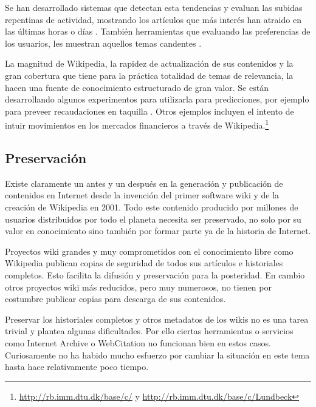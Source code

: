 \documentclass[11pt,onecolumn]{article}
\begin{document}
Se han desarrollado sistemas que detectan esta tendencias y evaluan las subidas repentinas de actividad, mostrando los artículos que más interés han atraido en las últimas horas o días \citep{osborne2012}. También herramientas que evaluando las preferencias de los usuarios, les muestran aquellos temas candentes \citep{ciglan2010}.


La magnitud de Wikipedia, la rapidez de actualización de sus contenidos y la gran cobertura que tiene para la práctica totalidad de temas de relevancia, la hacen una fuente de conocimiento estructurado de gran valor. Se están desarrollando algunos experimentos para utilizarla para predicciones, por ejemplo para preveer recaudaciones en taquilla \citep{mestyan2012}. Otros ejemplos incluyen el intento de intuir movimientos en los mercados financieros a través de Wikipedia.\footnote{\href{http://rb.imm.dtu.dk/base/c/}{http://rb.imm.dtu.dk/base/c/} y \href{http://rb.imm.dtu.dk/base/c/Lundbeck}{http://rb.imm.dtu.dk/base/c/Lundbeck}}

\subsection{Preservación}

Existe claramente un antes y un después en la generación y publicación de contenidos en Internet desde la invención del primer software wiki y de la creación de Wikipedia en 2001. Todo este contenido producido por millones de usuarios distribuidos por todo el planeta necesita ser preservado, no solo por su valor en conocimiento sino también por formar parte ya de la historia de Internet.

Proyectos wiki grandes y muy comprometidos con el conocimiento libre como Wikipedia publican copias de seguridad de todos sus artículos e historiales completos. Esto facilita la difusión y preservación para la posteridad. En cambio otros proyectos wiki más reducidos, pero muy numerosos, no tienen por costumbre publicar copias para descarga de sus contenidos.

Preservar los historiales completos y otros metadatos de los wikis no es una tarea trivial y plantea algunas dificultades. Por ello ciertas herramientas o servicios como Internet Archive o WebCitation no funcionan bien en estos casos. Curiosamente no ha habido mucho esfuerzo por cambiar la situación en este tema hasta hace relativamente poco tiempo.
\end{document}

